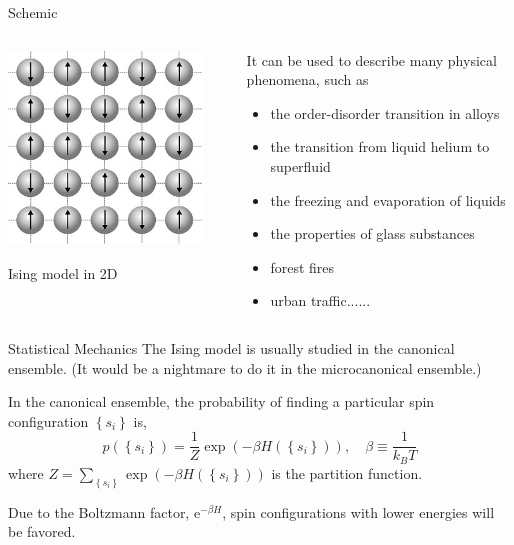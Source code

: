 \begin{frame}{Schemic}
\begin{columns}
	\begin{column}{0.5\textwidth}
		\centerline{\includegraphics[width = 0.9\textwidth]{Figures/2d.jpg}}
		\centerline{Ising model in 2D}
	\end{column}
	
	\begin{column}{0.5\textwidth}
		It can be used to describe many physical phenomena, such as
		\begin{itemize}
			\item the order-disorder transition in alloys
			\item the transition from liquid helium to superfluid
			\item the freezing and evaporation of liquids
			\item the properties of glass substances
			\item forest fires
			\item urban traffic......
		\end{itemize}
	\end{column}
\end{columns}
	\end{frame}

\begin{frame}{Statistical Mechanics}
	The Ising model is usually studied in \alert{the canonical ensemble}. (It would be a nightmare to do it in the microcanonical ensemble.)
\begin{theorem}
	In the canonical ensemble, the probability of finding a particular spin configuration $\left\{s_{i}\right\}$ is,
	$$p\left(\left\{s_{i}\right\}\right)=\frac{1}{Z} \exp \left(-\beta H\left(\left\{s_{i}\right\}\right)\right), \quad \beta \equiv \frac{1}{k_{B} T}$$
	where $Z=\sum_{\left\{s_{i}\right\}} \exp \left(-\beta H\left(\left\{s_{i}\right\}\right)\right)$ is the partition function. 
\end{theorem}

Due to the Boltzmann factor, $\mathrm{e}^{-\beta H}$, spin configurations with lower energies will be favored.
\end{frame}


